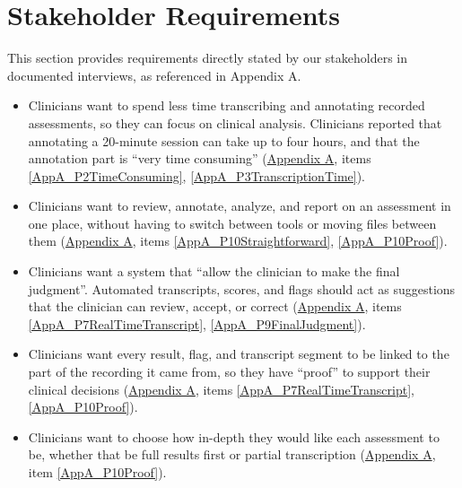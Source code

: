 \documentclass[12pt]{article}
\newcounter{srnum} %
\begin{document}
\section{Stakeholder Requirements}
This section provides requirements directly stated by our stakeholders in documented interviews, as referenced in Appendix A.

\noindent \begin{itemize}

\item[\textbf{SR\thesrnum}] \label{SR_ReduceAnnotationTime} Clinicians want to spend less time transcribing and annotating recorded assessments, so they can focus on clinical analysis.
Clinicians reported that annotating a 20-minute session can take up to four hours, and that the annotation part is ``very time consuming'' (\hyperref[sec:AppendixA]{Appendix A}, items \ref{AppA_P2TimeConsuming}, \ref{AppA_P3TranscriptionTime}).

\item[\textbf{SR\thesrnum}] \label{SR_SinglePlatform} Clinicians want to review, annotate, analyze, and report on an assessment in one place, without having to switch between tools or moving files between them (\hyperref[sec:AppendixA]{Appendix A}, items \ref{AppA_P10Straightforward}, \ref{AppA_P10Proof}).

\item[\textbf{SR\thesrnum}] \label{SR_ClinicianFinalJudgment} Clinicians want a system that ``allow the clinician to make the final judgment''. Automated transcripts, scores, and flags should act as suggestions that the clinician can review, accept, or correct (\hyperref[sec:AppendixA]{Appendix A}, items \ref{AppA_P7RealTimeTranscript}, \ref{AppA_P9FinalJudgment}).

\item[\textbf{SR\thesrnum}] \label{SR_EvidenceTraceability} Clinicians want every result, flag, and transcript segment to be linked to the part of the recording it came from, so they have ``proof'' to support their clinical decisions (\hyperref[sec:AppendixA]{Appendix A}, items \ref{AppA_P7RealTimeTranscript}, \ref{AppA_P10Proof}).

\item[\textbf{SR\thesrnum}] \label{SR_FlexibleWorkflows} Clinicians want to choose how in-depth they would like each assessment to be, whether that be full results first or partial transcription (\hyperref[sec:AppendixA]{Appendix A}, item \ref{AppA_P10Proof}).


\end{itemize}
\end{document}
